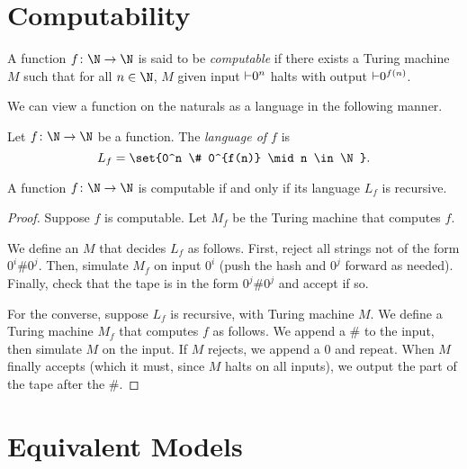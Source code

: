 \section{Computability} \label{sec:computability}
\begin{definition*}[Computability] \label{def:computability}
    A function $f\colon \N \to \N$ is said to be \emph{computable} if there
    exists a Turing machine $M$ such that for all $n \in \N$,
    $M$ given input ${\vdash} 0^n$ halts with output ${\vdash} 0^{f(n)}$.
\end{definition*}

We can view a function on the naturals as a language in the following
manner.
\begin{definition} \label{def:language}
    Let $f\colon \N \to \N$ be a function. The \emph{language of $f$} is
    \[
        L_f = \set{0^n \# 0^{f(n)} \mid n \in \N}.
    \]
\end{definition}

\begin{theorem*} \label{thm:computable}
    A function $f\colon \N \to \N$ is computable if and only if its language
    $L_f$ is recursive.
\end{theorem*}
\begin{proof}
    Suppose $f$ is computable.
    Let $M_f$ be the Turing machine that computes $f$.

    We define an $M$ that decides $L_f$ as follows.
    First, reject all strings not of the form $0^i \# 0^j$.
    Then, simulate $M_f$ on input $0^i$ (push the hash and $0^j$ forward
    as needed).
    Finally, check that the tape is in the form $0^j \# 0^j$ and accept if
    so.

    For the converse, suppose $L_f$ is recursive, with Turing machine $M$.
    We define a Turing machine $M_f$ that computes $f$ as follows.
    We append a \# to the input, then simulate $M$ on the input.
    If $M$ rejects, we append a $0$ and repeat.
    When $M$ finally accepts (which it must, since $M$ halts on all inputs),
    we output the part of the tape after the \#.
\end{proof}

\section{Equivalent Models} \label{sec:tm:equiv}
